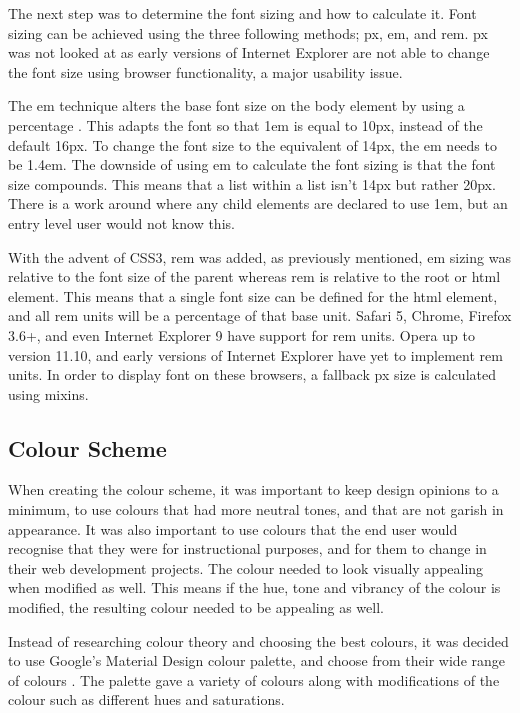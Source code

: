 The next step was to determine the font sizing and how to calculate it. Font sizing can be achieved using the three following methods; \gls{px}, \gls{em}, and \gls{rem}. \gls{px} was not looked at as early versions of Internet Explorer are not able to change the font size using browser functionality, a major usability issue. 

The \gls{em} technique alters the base font size on the body element by using a percentage \citep{GUN16}. This adapts the font so that 1em is equal to 10px, instead of the default 16px. To change the font size to the equivalent of 14px, the \gls{em} needs to be 1.4em. The downside of using \gls{em} to calculate the font sizing is that the font size compounds. This means that a list within a list isn't 14px but rather 20px. There is a work around where any child elements are declared to use 1em, but an entry level user would not know this. 

With the advent of \gls{CSS}3, \gls{rem} was added, as previously mentioned, \gls{em} sizing was relative to the font size of the parent whereas \gls{rem} is relative to the root or html element. This means that a single font size can be defined for the html element, and all \gls{rem} units will be a percentage of that base unit. Safari 5, Chrome, Firefox 3.6+, and even Internet Explorer 9 have support for \gls{rem} units. Opera up to version 11.10, and early versions of Internet Explorer have yet to implement \gls{rem} units. In order to display font on these browsers, a fallback \gls{px} size is calculated using \gls{mixins}. 

\subsection*{Colour Scheme}
When creating the colour scheme, it was important to keep design opinions to a minimum, to use colours that had more neutral tones, and that are not garish in appearance. It was also important to use colours that the end user would recognise that they were for instructional purposes, and for them to change in their web development projects. The colour needed to look visually appealing when modified as well. This means if the hue, tone and vibrancy of the colour is modified, the resulting colour needed to be appealing as well. 

Instead of researching colour theory and choosing the best colours, it was decided to use Google's Material Design colour palette, and choose from their wide range of colours \citep{Google17}. The palette  gave a variety of colours along with modifications of the colour such as different hues and saturations.

